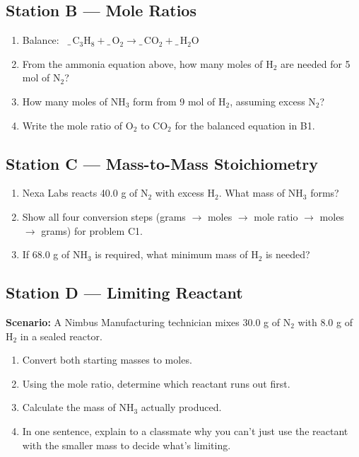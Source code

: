 \subsection*{Station B --- Mole Ratios}
\begin{enumerate}[label=B\arabic*.]
  \item Balance: \ $\mathrm{\_\,C_3H_8 + \_\,O_2 \rightarrow \_\,CO_2 + \_\,H_2O}$
  \item From the ammonia equation above, how many moles of $\mathrm{H_2}$ are needed for 5 mol of $\mathrm{N_2}$?
  \item How many moles of $\mathrm{NH_3}$ form from 9 mol of $\mathrm{H_2}$, assuming excess $\mathrm{N_2}$?
  \item Write the mole ratio of $\mathrm{O_2}$ to $\mathrm{CO_2}$ for the balanced equation in B1.
\end{enumerate}

\subsection*{Station C --- Mass-to-Mass Stoichiometry}
\begin{enumerate}[label=C\arabic*.]
  \item Nexa Labs reacts 40.0 g of $\mathrm{N_2}$ with excess $\mathrm{H_2}$. What mass of $\mathrm{NH_3}$ forms?
  \item Show all four conversion steps (grams $\to$ moles $\to$ mole ratio $\to$ moles $\to$ grams) for problem C1.
  \item If 68.0 g of $\mathrm{NH_3}$ is required, what minimum mass of $\mathrm{H_2}$ is needed?
\end{enumerate}

\subsection*{Station D --- Limiting Reactant}
\begin{tcolorbox}[colback=nimbusamber!10, colframe=nimbusamber, boxrule=0.5pt, arc=2pt, left=6pt, right=6pt, top=4pt, bottom=4pt]
\textbf{Scenario:} A Nimbus Manufacturing technician mixes 30.0 g of
$\mathrm{N_2}$ with 8.0 g of $\mathrm{H_2}$ in a sealed reactor.
\end{tcolorbox}
\begin{enumerate}[label=D\arabic*.]
  \item Convert both starting masses to moles.
  \item Using the mole ratio, determine which reactant runs out first.
  \item Calculate the mass of $\mathrm{NH_3}$ actually produced.
  \item In one sentence, explain to a classmate why you can't just use the reactant with the smaller mass to decide what's limiting.
\end{enumerate}

